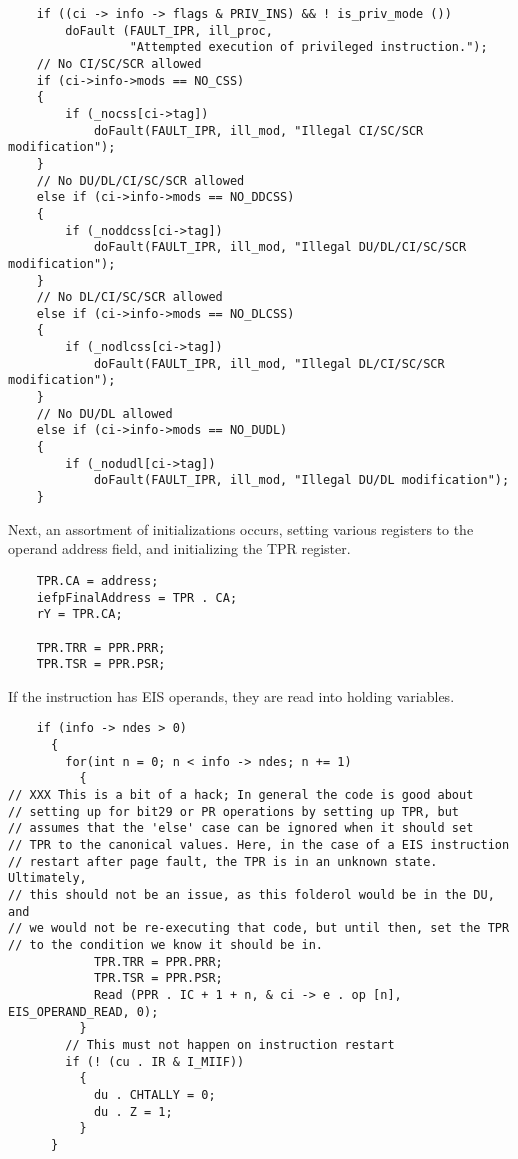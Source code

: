 \documentclass[notitlepage]{report}
\begin{document}
\begin{verbatim}
    if ((ci -> info -> flags & PRIV_INS) && ! is_priv_mode ())
        doFault (FAULT_IPR, ill_proc, 
                 "Attempted execution of privileged instruction.");
    // No CI/SC/SCR allowed
    if (ci->info->mods == NO_CSS)
    {
        if (_nocss[ci->tag])
            doFault(FAULT_IPR, ill_mod, "Illegal CI/SC/SCR modification");
    }
    // No DU/DL/CI/SC/SCR allowed
    else if (ci->info->mods == NO_DDCSS)
    {
        if (_noddcss[ci->tag])
            doFault(FAULT_IPR, ill_mod, "Illegal DU/DL/CI/SC/SCR modification");
    }
    // No DL/CI/SC/SCR allowed
    else if (ci->info->mods == NO_DLCSS)
    {
        if (_nodlcss[ci->tag])
            doFault(FAULT_IPR, ill_mod, "Illegal DL/CI/SC/SCR modification");
    }
    // No DU/DL allowed
    else if (ci->info->mods == NO_DUDL)
    {
        if (_nodudl[ci->tag])
            doFault(FAULT_IPR, ill_mod, "Illegal DU/DL modification");
    }
\end{verbatim}

Next, an assortment of initializations occurs, setting various registers
to the operand address field, and initializing the TPR register.

\begin{verbatim}
    TPR.CA = address;
    iefpFinalAddress = TPR . CA;
    rY = TPR.CA;

    TPR.TRR = PPR.PRR;
    TPR.TSR = PPR.PSR;
\end{verbatim}

If the instruction has EIS operands, they are read into holding variables.

\begin{verbatim}
    if (info -> ndes > 0)
      {
        for(int n = 0; n < info -> ndes; n += 1)
          {
// XXX This is a bit of a hack; In general the code is good about 
// setting up for bit29 or PR operations by setting up TPR, but
// assumes that the 'else' case can be ignored when it should set
// TPR to the canonical values. Here, in the case of a EIS instruction
// restart after page fault, the TPR is in an unknown state. Ultimately,
// this should not be an issue, as this folderol would be in the DU, and
// we would not be re-executing that code, but until then, set the TPR
// to the condition we know it should be in.
            TPR.TRR = PPR.PRR;
            TPR.TSR = PPR.PSR;
            Read (PPR . IC + 1 + n, & ci -> e . op [n], EIS_OPERAND_READ, 0);
          }
        // This must not happen on instruction restart
        if (! (cu . IR & I_MIIF))
          {
            du . CHTALLY = 0;
            du . Z = 1;
          }
      }
\end{verbatim}
\end{document}
